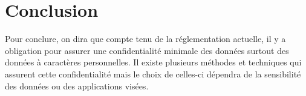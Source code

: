\chapter{Conclusion}
Pour conclure, on dira que compte tenu de la réglementation actuelle, il y a obligation pour assurer une  confidentialité minimale  des données surtout des données à caractères personnelles. Il existe plusieurs méthodes et techniques qui assurent cette confidentialité mais le choix de celles-ci dépendra de la sensibilité des données ou des applications visées.